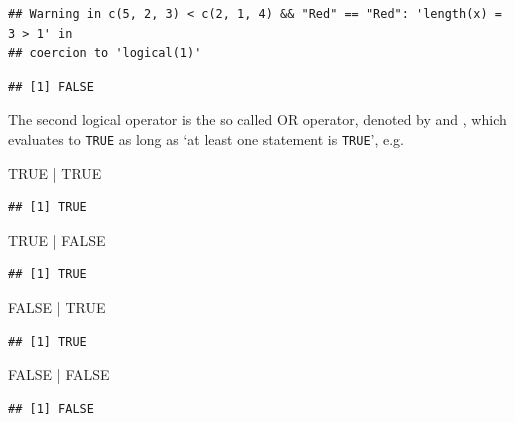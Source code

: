 \documentclass[
]{book}
\newenvironment{Shaded}{\begin{snugshade}}{\end{snugshade}}
\newcommand{\ConstantTok}[1]{\textcolor[rgb]{0.00,0.00,0.00}{#1}}
\newcommand{\SpecialCharTok}[1]{\textcolor[rgb]{0.00,0.00,0.00}{#1}}
\theoremstyle{definition}
\theoremstyle{definition}
\theoremstyle{definition}
\theoremstyle{definition}
\theoremstyle{remark}
\begin{document}
\begin{verbatim}
## Warning in c(5, 2, 3) < c(2, 1, 4) && "Red" == "Red": 'length(x) = 3 > 1' in
## coercion to 'logical(1)'
\end{verbatim}

\begin{verbatim}
## [1] FALSE
\end{verbatim}

The second logical operator is the so called OR operator, denoted by \texttt{\textbar{}} and \texttt{\textbar{}\textbar{}}, which evaluates to \texttt{TRUE} as long as `at least one statement is \texttt{TRUE}', e.g.

\begin{Shaded}
\begin{Highlighting}[]
\ConstantTok{TRUE} \SpecialCharTok{|} \ConstantTok{TRUE}
\end{Highlighting}
\end{Shaded}

\begin{verbatim}
## [1] TRUE
\end{verbatim}

\begin{Shaded}
\begin{Highlighting}[]
\ConstantTok{TRUE} \SpecialCharTok{|} \ConstantTok{FALSE}
\end{Highlighting}
\end{Shaded}

\begin{verbatim}
## [1] TRUE
\end{verbatim}

\begin{Shaded}
\begin{Highlighting}[]
\ConstantTok{FALSE} \SpecialCharTok{|} \ConstantTok{TRUE}
\end{Highlighting}
\end{Shaded}

\begin{verbatim}
## [1] TRUE
\end{verbatim}

\begin{Shaded}
\begin{Highlighting}[]
\ConstantTok{FALSE} \SpecialCharTok{|} \ConstantTok{FALSE}
\end{Highlighting}
\end{Shaded}

\begin{verbatim}
## [1] FALSE
\end{verbatim}
\end{document}
